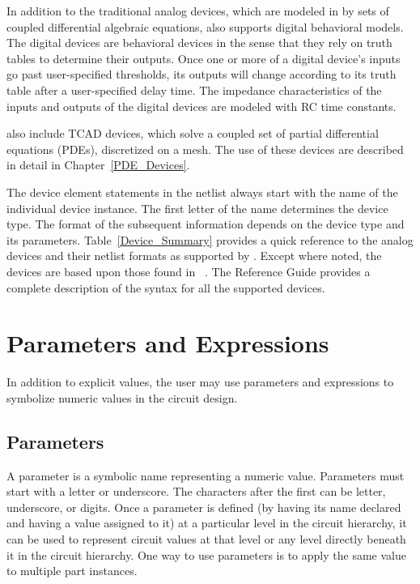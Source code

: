 In addition to the traditional analog devices, which are modeled in \Xyce{} by
sets of coupled differential algebraic equations, \Xyce{} also supports digital
  
behavioral models. The digital devices are behavioral devices in the sense that
they rely on truth tables to determine their outputs. Once one or more of a
digital device's inputs go past user-specified thresholds, its outputs will
change according to its truth table after a user-specified delay time. The
impedance characteristics of the inputs and outputs of the digital devices are
modeled with RC time constants. 

\Xyce{} also include TCAD devices, which solve a coupled set of partial
differential equations (PDEs), discretized on a mesh. The use of these devices
are described in detail in Chapter~\ref{PDE_Devices}.

The device element statements in the netlist always start with the name of the
individual  device instance. The first letter of the
name determines the device type. The format of the subsequent information
depends on the device type and its parameters.  Table~\ref{Device_Summary}
provides a quick reference to the analog devices and their netlist formats as
supported by \Xyce{}. Except where noted, the devices are based upon those
found in ~\cite{Grove:1967}. The \Xyce{} Reference Guide\ReferenceGuide{}
provides a complete description of the syntax for all the supported devices.



\section{Parameters and Expressions}
\label{Parameters_Expressions}

In addition to explicit values, the user may use parameters and expressions to symbolize numeric values in the circuit design.

\subsection{Parameters}

A parameter is a symbolic name representing a numeric value. Parameters must start with a letter or underscore. The characters after the first can be letter, underscore, or digits. Once a parameter is defined (by having its name declared and having a value assigned to it) at a particular level in the circuit hierarchy, it can be used to represent circuit values at that level or any level directly beneath it in the circuit hierarchy. One way to use parameters is to apply the same value to multiple part instances.


